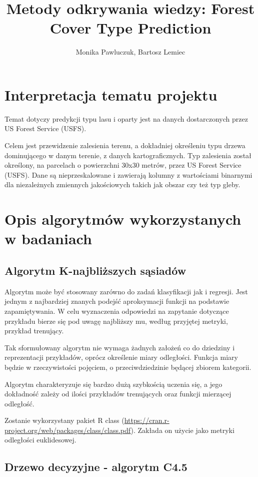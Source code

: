 \documentclass[11pt]{article} %
\title{Metody odkrywania wiedzy: Forest Cover Type Prediction}
\author{Monika Pawluczuk, Bartosz Lemiec}
\begin{document}
\maketitle

\section{Interpretacja tematu projektu}

Temat dotyczy predykcji typu lasu i oparty jest na danych dostarczonych przez US Forest Service (USFS). 

Celem jest przewidzenie zalesienia terenu, a dokładniej określeniu typu drzewa dominującego w danym terenie, z danych kartograficznych. Typ zalesienia został określony, na parcelach o powierzchni 30x30 metrów, przez US Forest Service (USFS). Dane są nieprzeskalowane i zawierają kolumny z wartościami binarnymi dla niezależnych zmiennych jakościowych takich jak obszar czy też typ gleby.

\section{Opis algorytmów wykorzystanych w badaniach}
\subsection{Algorytm K-najbliższych sąsiadów}

Algorytm może być stosowany zarówno do zadań klasyfikacji jak i regresji. Jest jednym z najbardziej znanych podejść aproksymacji funkcji na podstawie zapamiętywania. W celu wyznaczenia odpowiedzi na zapytanie dotyczące przykładu bierze się pod uwagę najbliższy mu, według przyjętej metryki, przykład trenujący.  

Tak sformułowany algorytm nie wymaga żadnych założeń co do dziedziny i reprezentacji przykładów, oprócz określenie miary odległości. Funkcja miary będzie w rzeczywistości pojęciem, o przeciwdziedzinie będącej zbiorem kategorii.

Algorytm charakteryzuje się bardzo dużą szybkością uczenia się, a jego dokładność zależy od ilości przykładów trenujących oraz funkcji mierzącej odległość.

Zostanie wykorzystany pakiet R class (\url{https://cran.r-project.org/web/packages/class/class.pdf}). Zakłada on użycie jako metryki odległości euklidesowej.

\subsection{Drzewo decyzyjne - algorytm C4.5}
\end{document}
